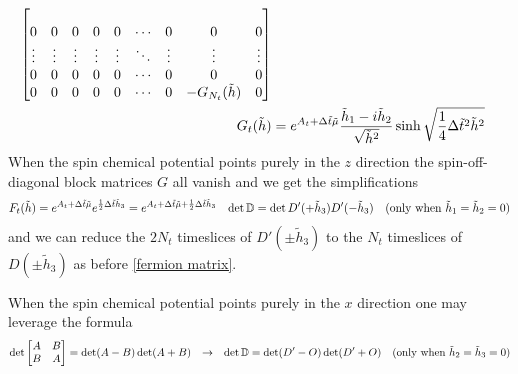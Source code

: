 \begin{align}
\begin{bmatrix}
\\	0               & 0         & 0                 & 0         & 0      & \cdots & 0       & 0                    & 0
\\	\vdots          & \vdots    & \vdots            & \vdots    & \vdots & \ddots & \vdots  & \vdots               & \vdots
\\	0               & 0         & 0                 & 0         & 0      & \cdots & 0       & 0                    & 0
\\	0               & 0         & 0                 & 0         & 0      & \cdots & 0       & -G_{N_t}(\tilde{h})  & 0
	\end{bmatrix}
    \\
	G_t(\tilde{h}) &= e^{A_t + \Delta\tilde{t}\tilde{\mu}} \frac{\tilde{h}_1 - i\tilde{h}_2}{\sqrt{\tilde{h}^2}} \sinh\sqrt{\frac{1}{4}\Delta\tilde{t}^2 \tilde{h}^2}
\end{align}
When the spin chemical potential points purely in the $z$ direction the spin-off-diagonal block matrices $G$ all vanish and we get the simplifications
\begin{align}
	F_t(\tilde{h}) &= e^{A_t + \Delta\tilde{t}\tilde{\mu}} e^{\frac{1}{2} \Delta\tilde{t} \tilde{h}_3} = e^{A_t + \Delta\tilde{t}\tilde{\mu} + \frac{1}{2} \Delta\tilde{t} \tilde{h}_3}
	&
	\det \mathbb{D} &= \det D'(+\tilde{h}_3) D'(-\tilde{h}_3)
	&
	(\text{only when }\tilde{h}_1=\tilde{h}_2=0)
	\label{eq:fermion determinant with h3}
\end{align}
and we can reduce the $2N_t$ timeslices of $D'(\pm\tilde{h}_3)$ to the $N_t$ timeslices of $D(\pm\tilde{h}_3)$ as before \eqref{fermion matrix}.

When the spin chemical potential points purely in the $x$ direction one may leverage the formula
\begin{align}
	\det \begin{bmatrix} A & B \\ B & A \end{bmatrix} &= \det(A-B) \det(A+B)
	&\rightarrow
	&&
	\det \mathbb{D} &= \det(D'-O) \det(D'+O)
	&
	(\text{only when }\tilde{h}_2=\tilde{h}_3=0)
\end{align}

